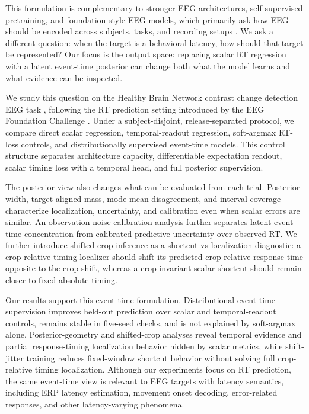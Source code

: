 \documentclass[12pt]{article}
\begin{document}
This formulation is complementary to stronger EEG architectures, self-supervised pretraining, and foundation-style EEG models, which primarily ask how EEG should be encoded across subjects, tasks, and recording setups \citep{wang2024eegpt,Jiang2024LaBraM,Chen2024EEGFormer,Wang2025EEGMamba,ElOuahidi2025REVE,Yue2024BrainGPT}. We ask a different question: when the target is a behavioral latency, how should that target be represented? Our focus is the output space: replacing scalar RT regression with a latent event-time posterior can change both what the model learns and what evidence can be inspected.

We study this question on the Healthy Brain Network contrast change detection EEG task \citep{Shirazi2024HBNEEG}, following the RT prediction setting introduced by the EEG Foundation Challenge \citep{EEGFoundationChallengeArxiv2025,EEGChallengeWebsite2025}. Under a subject-disjoint, release-separated protocol, we compare direct scalar regression, temporal-readout regression, soft-argmax RT-loss controls, and distributionally supervised event-time models. This control structure separates architecture capacity, differentiable expectation readout, scalar timing loss with a temporal head, and full posterior supervision.

The posterior view also changes what can be evaluated from each trial. Posterior width, target-aligned mass, mode-mean disagreement, and interval coverage characterize localization, uncertainty, and calibration even when scalar errors are similar. An observation-noise calibration analysis further separates latent event-time concentration from calibrated predictive uncertainty over observed RT. We further introduce shifted-crop inference as a shortcut-vs-localization diagnostic: a crop-relative timing localizer should shift its predicted crop-relative response time opposite to the crop shift, whereas a crop-invariant scalar shortcut should remain closer to fixed absolute timing.

Our results support this event-time formulation. Distributional event-time supervision improves held-out prediction over scalar and temporal-readout controls, remains stable in five-seed checks, and is not explained by soft-argmax alone. Posterior-geometry and shifted-crop analyses reveal temporal evidence and partial response-timing localization behavior hidden by scalar metrics, while shift-jitter training reduces fixed-window shortcut behavior without solving full crop-relative timing localization. Although our experiments focus on RT prediction, the same event-time view is relevant to EEG targets with latency semantics, including ERP latency estimation, movement onset decoding, error-related responses, and other latency-varying phenomena.
\end{document}
